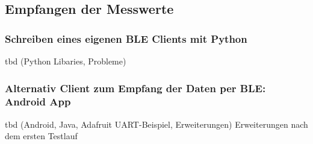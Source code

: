\subsection{Empfangen der Messwerte}

\subsubsection{Schreiben eines eigenen BLE Clients mit Python}
tbd (Python Libaries, Probleme)

\subsubsection{Alternativ Client zum Empfang der Daten per BLE: Android App}
tbd (Android, Java, Adafruit UART-Beispiel, Erweiterungen)
Erweiterungen nach dem ersten Testlauf